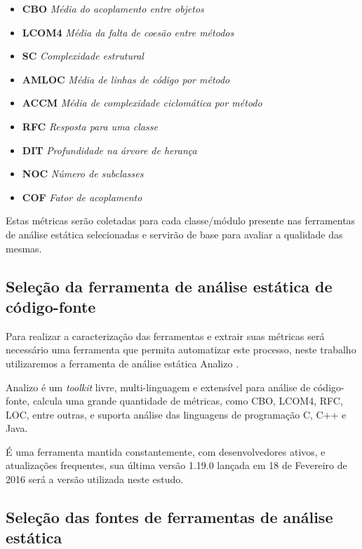 \documentclass[qual, classic, a4paper]{ufbathesis}
\begin{document}
\begin{itemize}
  \item {\bf CBO} {\it Média do acoplamento entre objetos}
  \item {\bf LCOM4} {\it Média da falta de coesão entre métodos}
  \item {\bf SC} {\it Complexidade estrutural}
  \item {\bf AMLOC} {\it Média de linhas de código por método}
  \item {\bf ACCM} {\it Média de complexidade ciclomática por método}
  \item {\bf RFC} {\it Resposta para uma classe }
  \item {\bf DIT} {\it Profundidade na árvore de herança}
  \item {\bf NOC} {\it Número de subclasses}
  \item {\bf COF} {\it Fator de acoplamento}
\end{itemize}

Estas métricas serão coletadas para cada classe/módulo presente nas
ferramentas de análise estática selecionadas e servirão de base para
avaliar a qualidade das mesmas.

\subsection{Seleção da ferramenta de análise estática de código-fonte}

Para realizar a caracterização das ferramentas e extrair suas métricas
será necessário uma ferramenta que permita automatizar este
processo, neste trabalho utilizaremos a ferramenta de análise estática Analizo
\cite{Terceiro2010}.

Analizo é um {\it toolkit} livre, multi-linguagem e extensível para análise de
código-fonte, calcula uma grande quantidade de métricas, como CBO, LCOM4, RFC,
LOC, entre outras, e suporta análise das linguagens de programação C, C++ e
Java.

É uma ferramenta mantida constantemente, com desenvolvedores ativos, e
atualizações frequentes, sua última versão 1.19.0 lançada em 18 de Fevereiro
de 2016 será a versão utilizada neste estudo.


\subsection{Seleção das fontes de ferramentas de análise estática}\label{levantamento}
\end{document}
